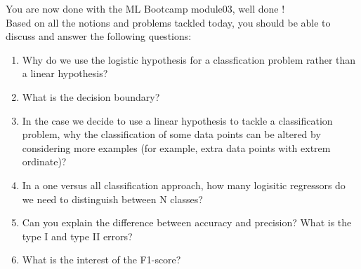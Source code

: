 \documentclass{42-en}
\begin{document}
You are now done with the ML Bootcamp module03, well done !\\
\newline
Based on all the notions and problems
tackled today, you should be able to discuss and answer the following questions:

\begin{enumerate}
  \item Why do we use the logistic hypothesis for a classfication problem 
  rather than a linear hypothesis?
  \item What is the decision boundary?
  \item In the case we decide to use a linear hypothesis to tackle a 
  classification problem, why the classification of some data points can be
   altered by considering more examples (for example, extra data points with extrem ordinate)?
  \item In a one versus all classification approach, how many logisitic regressors do we
   need to distinguish between N classes?
  \item Can you explain the difference between accuracy and precision?
   What is the type I and type II errors?
  \item What is the interest of the F1-score?
\end{enumerate}
\newpage

\end{document}
